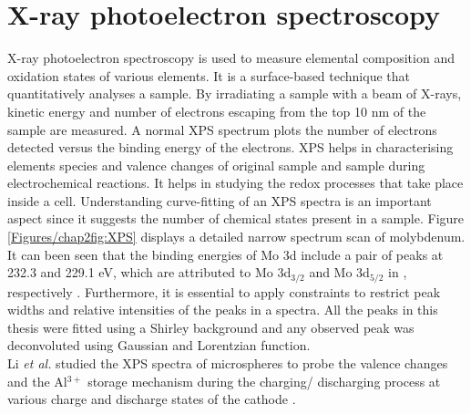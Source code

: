 \section{X-ray photoelectron spectroscopy}
 X-ray photoelectron spectroscopy is used to measure elemental composition and oxidation states of various elements. It is a surface-based technique that quantitatively analyses a sample. By irradiating a sample with a beam of X-rays, kinetic energy and number of electrons escaping from the top 10 nm of the sample are measured. 
A normal XPS spectrum plots the number of electrons detected versus the binding energy of the electrons. XPS helps in characterising elements species and valence changes of original sample and sample during electrochemical reactions. It helps in studying the redox processes that take place inside a cell. Understanding curve-fitting of an XPS spectra is an important aspect since it suggests the number of chemical states present in a sample. Figure \ref{Figures/chap2fig:XPS} displays a detailed narrow spectrum scan of molybdenum. It can been seen that the binding energies of Mo 3d include a pair of peaks at 232.3 and 229.1 eV, which are attributed to Mo 3d$_{3/2}$ and Mo 3d$_{5/2}$ in , respectively \cite{grim_x-ray_1975}. Furthermore, it is essential to apply constraints to restrict peak widths and relative intensities of the peaks in a spectra. All the peaks in this thesis were fitted using a Shirley background and any observed peak was deconvoluted using Gaussian and Lorentzian function. \\
Li \textit{et al.} studied the XPS spectra of  microspheres to probe the valence changes and the Al$^{3+}$ storage mechanism during the charging/ discharging process at various charge and discharge states of the cathode \cite{li_rechargeable_2018}.

